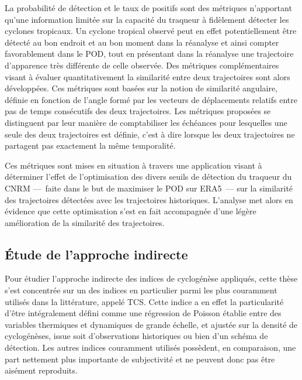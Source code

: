 \documentclass[../main.tex]{subfiles}
\begin{document}
La probabilité de détection et le taux de positifs sont des métriques n'apportant qu'une information limitée sur la capacité du traqueur à fidèlement détecter
les cyclones tropicaux. Un cyclone tropical observé peut en effet potentiellement être détecté au bon endroit et au bon moment dans la réanalyse et ainsi
compter favorablement dans le POD, tout en présentant dans la réanalyse une trajectoire d'apparence très différente de celle observée. Des métriques
complémentaires visant à évaluer quantitativement la similarité entre deux trajectoires sont alors développées. Ces métriques sont basées sur la notion de
similarité angulaire, définie en fonction de l'angle formé par les vecteurs de déplacements relatifs entre pas de temps consécutifs des deux trajectoires. Les
métriques proposées se distinguent par leur manière de comptabiliser les échéances pour lesquelles une seule des deux trajectoires est définie, c'est à dire
lorsque les deux trajectoires ne partagent pas exactement la même temporalité. 

Ces métriques sont mises en situation à travers une application visant à déterminer l'effet de l'optimisation des divers seuils de détection du traqueur du CNRM
---~faite dans le but de maximiser le POD sur ERA5~--- sur la similarité des trajectoires détectées avec les trajectoires historiques. L'analyse met alors en
évidence que cette optimisation s'est en fait accompagnée d'une légère amélioration de la similarité des trajectoires.

\subsection*{Étude de l'approche indirecte}

Pour étudier l'approche indirecte des indices de cyclogénèse appliqués, cette thèse s'est concentrée sur un des indices en particulier parmi les plus couramment
utilisés dans la littérature, appelé TCS. Cette indice a en effet la particularité d'être intégralement défini comme une régression de Poisson établie entre des
variables thermiques et dynamiques de grande échelle, et ajustée sur la densité de cyclogénèses, issue soit d'observations historiques ou bien d'un schéma de
détection. Les autres indices couramment utilisés possèdent, en comparaison, une part nettement plus importante de subjectivité et ne peuvent donc pas être
aisément reproduits.
\end{document}
